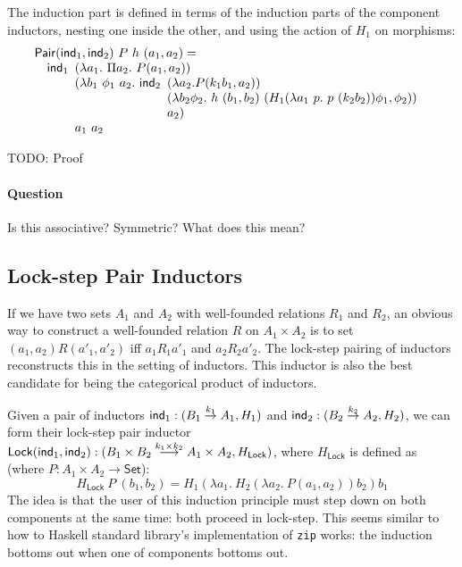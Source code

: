 \documentclass{amsart}
\newcommand{\Set}{\mathsf{Set}}
\begin{document}
The induction part is defined in terms of the induction parts of the
component inductors, nesting one inside the other, and using the
action of $H_1$ on morphisms:
\begin{displaymath}
  \begin{array}[t]{l}
    \mathsf{Pair}(\ind_1, \ind_2)\ P\ h\ (a_1,a_2) = \\
    \quad \ind_1
    \begin{array}[t]{l}
      (\lambda a_1.\ \Pi a_2.\ P(a_1,a_2)) \\
      (\lambda b_1\ \phi_1\ a_2.\ \ind_2
      \begin{array}[t]{l}
        (\lambda a_2. P(k_1b_1,a_2)) \\
        (\lambda b_2 \phi_2.\ h\ (b_1,b_2)\ (H_1(\lambda a_1\ p.\ p\ (k_2b_2))\phi_1,\phi_2)) \\
        a_2)
      \end{array} \\
      a_1\ a_2
    \end{array}
  \end{array}
\end{displaymath}

TODO: Proof

\paragraph{Question} Is this associative? Symmetric? What does this
mean?

\subsection{Lock-step Pair Inductors}

If we have two sets $A_1$ and $A_2$ with well-founded relations $R_1$
and $R_2$, an obvious way to construct a well-founded relation $R$ on
$A_1 \times A_2$ is to set $(a_1,a_2)R(a'_1,a'_2)$ iff $a_1R_1a'_1$
and $a_2R_2a'_2$. The lock-step pairing of inductors reconstructs this
in the setting of inductors. This inductor is also the best candidate
for being the categorical product of inductors.

Given a pair of inductors $\mathsf{ind}_1 : (B_1 \stackrel{k_1}\to A_1, H_1)$
and $\mathsf{ind}_2 : (B_2 \stackrel{k_2}\to A_2, H_2)$, we can form their
lock-step pair inductor $\mathsf{Lock}(\mathsf{ind}_1, \mathsf{ind}_2) : (B_1 \times
B_2 \stackrel{k_1 \times k_2}\longrightarrow A_1 \times A_2,
H_{\mathsf{Lock}})$, where $H_{\mathsf{Lock}}$ is defined as (where $P
: A_1 \times A_2 \to \Set$):
\begin{displaymath}
  H_{\mathsf{Lock}}\ P\ (b_1,b_2) = H_1(\lambda a_1.\ H_2(\lambda a_2.\ P(a_1,a_2))b_2)b_1
\end{displaymath}
The idea is that the user of this induction principle must step down
on both components at the same time: both proceed in lock-step. This
seems similar to how to Haskell standard library's implementation of
\texttt{zip} works: the induction bottoms out when one of components
bottoms out.
\end{document}
